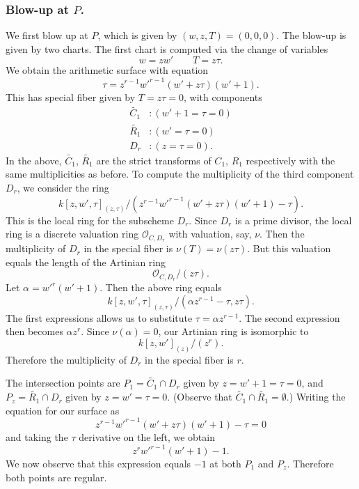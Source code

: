 \documentclass[reqno]{amsart}
\theoremstyle{definition}
\theoremstyle{remark}
\def\sO{\mathcal{O}}
\begin{document}
\subsubsection{Blow-up at $P$.}
\label{sec:blow-up-P}

We first blow up at $P$, which is given by $(w,z,T) = (0,0,0)$. The blow-up is given by two charts. The first chart is computed via the change of variables
\[
w = zw' \qquad T = z\tau.
\]
We obtain the arithmetic surface with equation
\[
\tau = z^{r-1}w'^{r-1}(w' + z\tau)(w' + 1).
\]
This has special fiber given by $T = z\tau = 0$, with components
\begin{align*}
  \tilde{C_1}&: (w' + 1 = \tau = 0) \\
  \tilde{R_1}&: (w' = \tau = 0) \\
  D_r&: (z = \tau = 0).
\end{align*}
In the above, $\tilde{C_1}$, $\tilde{R_1}$ are the strict transforms of $C_1$, $R_1$ respectively with the same multiplicities as before. To compute the multiplicity of the third component $D_r$, we consider the ring
\[
{k[z,w',\tau]_{(z,\tau)}}/{(z^{r-1}w'^{r-1}(w' + z\tau)(w' + 1) - \tau)}.
\]
This is the local ring for the subscheme $D_r$. Since $D_r$ is a prime divisor, the local ring is a discrete valuation ring $\sO_{C,D_r}$ with valuation, say, $\nu$. Then the multiplicity of $D_r$ in the special fiber is $\nu(T) = \nu(z\tau)$. But this valuation equals the length of the Artinian ring
\[
{\sO_{C,D_r}}/{(z\tau)}.
\]
Let $\alpha = w'^{r}(w'+1)$. Then the above ring equals
\[
{k[z,w',\tau]_{(z,\tau)}}/{(\alpha z^{r-1} - \tau, z\tau)}.
\]
The first expressions allows us to substitute $\tau = \alpha z^{r-1}$. The second expression then becomes $\alpha z^r$. Since $\nu(\alpha) = 0$, our Artinian ring is isomorphic to
\[
{k[z,w']_{(z)}}/{(z^r)}.
\]
Therefore the multiplicity of $D_r$ in the special fiber is $r$.

The intersection points are $P_1 = \tilde{C_1} \cap D_r$ given by $z=w'+1=\tau=0$, and $P_z = \tilde{R_1} \cap D_r$ given by $z=w'=\tau=0$. (Observe that $\tilde{C_1} \cap \tilde{R_1} = \emptyset$.) Writing the equation for our surface as
\[
z^{r-1}w'^{r-1}(w' + z\tau)(w' + 1) - \tau = 0
\]
and taking the $\tau$ derivative on the left, we obtain
\[
z^rw'^{r-1}(w' + 1) - 1.
\]
We now observe that this expression equals $-1$ at both $P_1$ and $P_z$. Therefore both points are regular.
\end{document}
